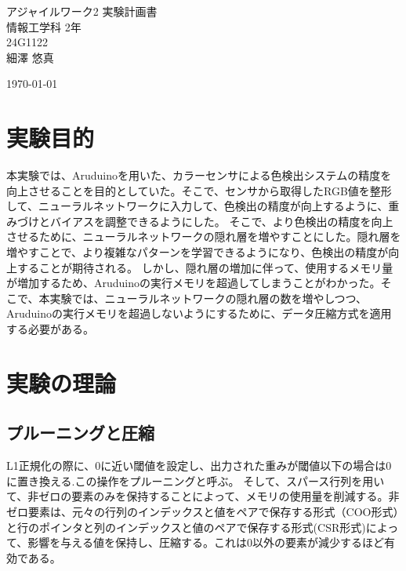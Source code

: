 \documentclass[uplatex,dvipdfmx]{jsarticle}
\begin{document}
\begin{titlepage}
\vspace*{2cm}
\centering
\Huge\textsf{アジャイルワーク2 実験計画書}\\[1.5cm]
\Large\textsf{情報工学科 2年}\\
\Large\textsf{24G1122}\\[5pt]
\huge\textsf{細澤 悠真}

\vspace*{1cm}
\Large\sffamily

\vspace*{2cm}
\Large\textsf{\today}
\end{titlepage}
\newpage
\section{実験目的}
本実験では、Aruduinoを用いた、カラーセンサによる色検出システムの精度を向上させることを目的としていた。そこで、センサから取得したRGB値を整形して、ニューラルネットワークに入力して、色検出の精度が向上するように、重みづけとバイアスを調整できるようにした。
そこで、より色検出の精度を向上させるために、ニューラルネットワークの隠れ層を増やすことにした。隠れ層を増やすことで、より複雑なパターンを学習できるようになり、色検出の精度が向上することが期待される。
しかし、隠れ層の増加に伴って、使用するメモリ量が増加するため、Aruduinoの実行メモリを超過してしまうことがわかった。そこで、本実験では、ニューラルネットワークの隠れ層の数を増やしつつ、Aruduinoの実行メモリを超過しないようにするために、データ圧縮方式を適用する必要がある。
\section{実験の理論}
\subsection{プルーニングと圧縮} %
L1正規化の際に、0に近い閾値を設定し、出力された重みが閾値以下の場合は0に置き換える.この操作をプルーニングと呼ぶ。
そして、スパース行列を用いて、非ゼロの要素のみを保持することによって、メモリの使用量を削減する。非ゼロ要素は、元々の行列のインデックスと値をペアで保存する形式（COO形式）と行のポインタと列のインデックスと値のペアで保存する形式(CSR形式)によって、影響を与える値を保持し、圧縮する。これは0以外の要素が減少するほど有効である。

\end{document}
